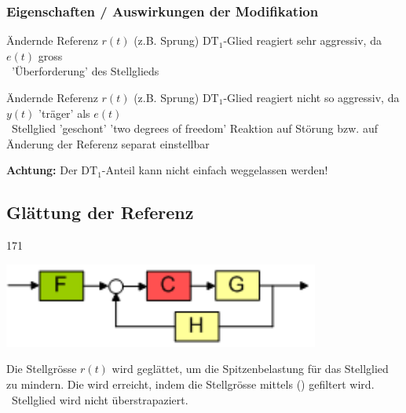 \subsubsection{Eigenschaften / Auswirkungen der Modifikation}

\begin{minipage}[t]{0.48\columnwidth}
    \raggedright
    \begin{center}
        \textbf{}
    \end{center}

    \begin{outline}
        \1 Ändernde Referenz $r(t)$ (z.B. Sprung)
            \2 $\text{DT}_1$-Glied reagiert sehr aggressiv, da $e(t)$ gross \\
                \textrightarrow\ 'Überforderung' des Stellglieds
    \end{outline}

\end{minipage}
\hfill
\begin{minipage}[t]{0.48\columnwidth}
    \raggedright
    \begin{center}
        \textbf{}
    \end{center}

    \begin{outline}
        \1 Ändernde Referenz $r(t)$ (z.B. Sprung)
            \2 $\text{DT}_1$-Glied reagiert nicht so aggressiv, da $y(t)$ 'träger' als $e(t)$ \\
                \textrightarrow\  Stellglied 'geschont'
        \1 'two degrees of freedom'
            \2 Reaktion auf Störung bzw. auf Änderung der Referenz separat einstellbar
    \end{outline}
\end{minipage}

\textbf{Achtung:} Der $\text{DT}_1$-Anteil kann nicht einfach weggelassen werden! 


\subsection{Glättung der Referenz}{171}

\begin{minipage}[c]{0.3\columnwidth}
    \includegraphics[width=\columnwidth]{images/filterung_stellgroesse.png}
\end{minipage}
\hfill
\begin{minipage}[c]{0.68\columnwidth}
    Die Stellgrösse $r(t)$ wird geglättet, um die Spitzenbelastung für das Stellglied zu mindern. Die wird erreicht, indem die 
    Stellgrösse mittels () gefiltert wird. \textrightarrow\ Stellglied wird nicht überstrapaziert.
\end{minipage}


